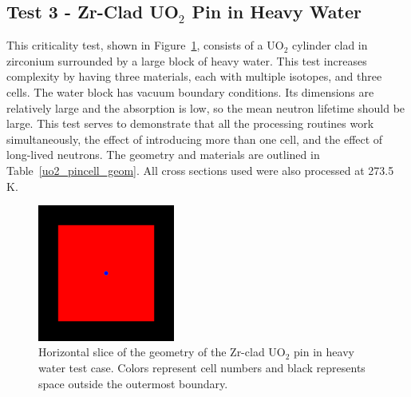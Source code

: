 \documentclass[preprint,12pt]{elsarticle}
\begin{document}
\newpage
\subsection{Test 3 - Zr-Clad UO$_2$ Pin in Heavy Water}

This criticality test, shown in Figure~\ref{pincell_geom_pic}, consists of a UO$_2$ cylinder clad in zirconium surrounded by a large block of heavy water.  This test increases complexity by having three materials, each with multiple isotopes, and three cells.  The water block has vacuum boundary conditions.  Its dimensions are relatively large and the absorption is low, so the mean neutron lifetime should be large.  This test serves to demonstrate that all the processing routines work simultaneously,
 the effect of introducing more than one cell, and the effect of long-lived neutrons.  The geometry and materials are outlined in Table~\ref{uo2_pincell_geom}.  All cross sections used were also processed at 273.5 K.

\begin{figure}[!htbp] 
  \centering
    \includegraphics[width=0.4\textwidth]{graphics/pincell-xy.png}
     \caption{  Horizontal slice of the geometry of the Zr-clad UO$_2$ pin in heavy water test case.  Colors represent cell numbers and black represents space outside the outermost boundary. \label{pincell_geom_pic} }
\end{figure}
\end{document}
